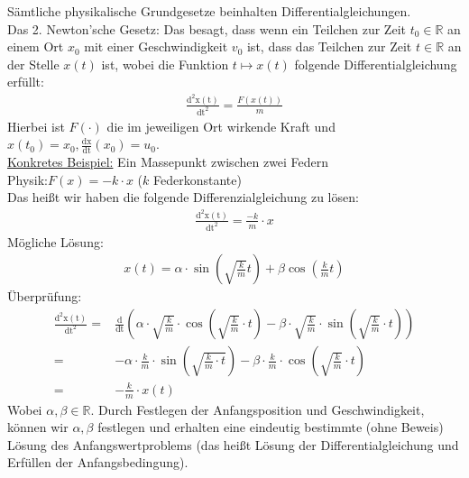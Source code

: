 \begin{Beispiel}{
	Sämtliche physikalische Grundgesetze beinhalten 
	Differentialgleichungen.\\
	Das 2. Newton'sche Gesetz: Das besagt, dass wenn ein Teilchen zur Zeit 
	$t_0 \in \mathbb{R}$ an einem Ort $x_0$ mit einer Geschwindigkeit $v_0$ 
	ist, dass das Teilchen zur Zeit $t \in \mathbb{R}$ an der Stelle 
	$x(t)$ ist, wobei die Funktion $t \mapsto x(t)$ folgende 
	Differentialgleichung erfüllt:
	\begin{align*}
		\frac{\mathrm{d^2x(t)}}{\mathrm{dt^2}} = \frac{F(x(t))}{m}
	\end{align*}
	Hierbei ist $F(\cdot)$ die im jeweiligen Ort wirkende Kraft und 
	$x(t_0) = x_0, \frac{\mathrm{dx}}{\mathrm{dt}}(x_0) = u_0$.\\
	\underline{Konkretes Beispiel:} Ein Massepunkt zwischen zwei Federn \\
	Physik:$F(x) = -k \cdot x$ ($k$ Federkonstante)\\
	Das heißt wir haben die folgende Differenzialgleichung zu lösen:
	\begin{align*}
		\frac{\mathrm{d^2x(t)}}{\mathrm{dt^2}} = \frac{-k}{m} \cdot x
	\end{align*}
	Mögliche Lösung:
	\begin{align*}
		x(t) = \alpha \cdot \sin\left(\sqrt{\frac{k}{m}}t\right) 
			+ \beta \cos\left(\frac{k}{m}t\right)
	\end{align*}
	Überprüfung:
	\begin{align*}
	\frac{\mathrm{d^2x(t)}}{\mathrm{dt^2}} = 
	&\frac{\mathrm{d}}{\mathrm{dt}} \left(\alpha \cdot \sqrt{\frac{k}{m}} 
		\cdot \cos\left( \sqrt{\frac{k}{m}} \cdot t\right) - \beta \cdot 	
		\sqrt{\frac{k}{m}} \cdot \sin\left( \sqrt{\frac{k}{m}}
		\cdot t\right)\right) \\
	= & - \alpha \cdot \frac{k}{m} \cdot \sin\left(\sqrt{\frac{k}{m}\cdot t}\right)
		- \beta \cdot \frac{k}{m} \cdot \cos\left(\sqrt{\frac{k}{m}} \cdot t\right) 	
		\\
	= & - \frac{k}{m} \cdot x(t)
	\end{align*}
	Wobei $\alpha, \beta \in \mathbb{R}$. Durch Festlegen der 
	Anfangsposition und Geschwindigkeit, können wir $\alpha, \beta$ 
	festlegen und erhalten eine eindeutig bestimmte (ohne Beweis) Lösung 
	des Anfangswertproblems (das heißt Lösung der Differentialgleichung 
	und Erfüllen der Anfangsbedingung). 
}\end{Beispiel}

